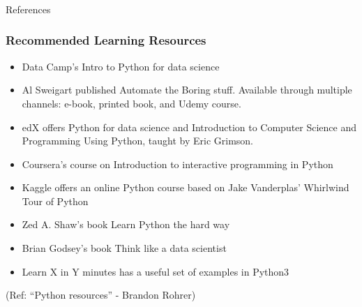 \begin{frame}[fragile]\frametitle{}
\begin{center}
{\Large References}
\end{center}
\end{frame}

\begin{frame}\frametitle{Recommended Learning Resources}
\scriptsize
\begin{itemize}
\item Data Camp's Intro to Python for data science
\item Al Sweigart published Automate the Boring stuff. Available through multiple channels: e-book, printed book, and Udemy course.
\item edX offers Python for data science and Introduction to Computer Science and Programming Using Python, taught by Eric Grimson.
\item Coursera's course on Introduction to interactive programming in Python
\item Kaggle offers an online Python course based on Jake Vanderplas' Whirlwind Tour of Python
\item Zed A. Shaw's book Learn Python the hard way
\item Brian Godsey's book Think like a data scientist
\item Learn X in Y minutes has a useful set of examples in Python3
\end{itemize}
(Ref: ``Python resources'' - Brandon Rohrer)
\end{frame}
